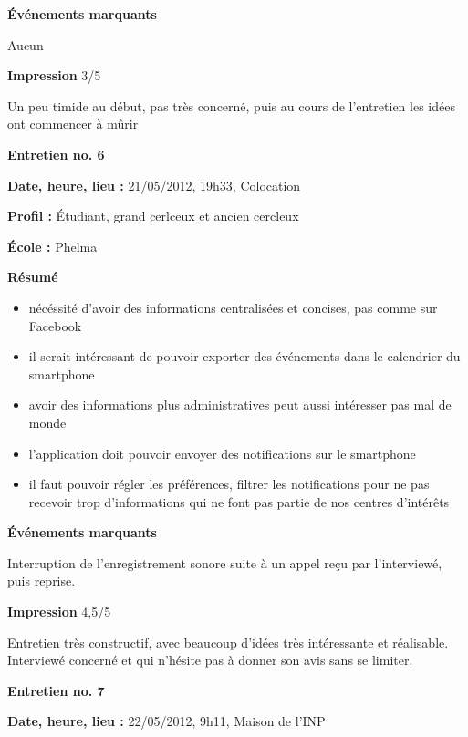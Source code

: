 \documentclass[a4paper, 11px]{article}
\begin{document}
\textbf{Événements marquants}

Aucun

\textbf{Impression} 3/5

Un peu timide au début, pas très concerné, puis au cours de l'entretien les idées ont commencer à mûrir



\vspace{.3cm}

 \textbf {\large Entretien no. 6}

\textbf{Date, heure, lieu : }
21/05/2012, 19h33, Colocation

\textbf{Profil : }
Étudiant, grand cerlceux et ancien cercleux


\textbf{École : }
Phelma

\textbf{Résumé}
	\begin{itemize}
		\item nécéssité d'avoir des informations centralisées et concises, pas comme sur Facebook
		\item il serait intéressant de pouvoir exporter des événements dans le calendrier du smartphone
		\item avoir des informations plus administratives peut aussi intéresser pas mal de monde
		\item l'application doit pouvoir envoyer des notifications sur le smartphone
		\item il faut pouvoir régler les préférences, filtrer les notifications pour ne pas recevoir trop d'informations qui ne font pas partie de nos centres d'intérêts
	\end{itemize}
\vspace{.25cm}


\textbf{Événements marquants}

Interruption de l'enregistrement sonore suite à un appel reçu par l'interviewé, puis reprise.

\textbf{Impression} 4,5/5

Entretien très constructif, avec beaucoup d'idées très intéressante et réalisable. Interviewé concerné et qui n'hésite pas à donner son avis sans se limiter.




\vspace{.3cm}

 \textbf {\large Entretien no. 7}

\textbf{Date, heure, lieu : }
22/05/2012, 9h11, Maison de l'INP
\end{document}
